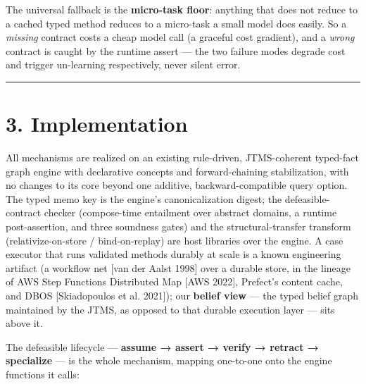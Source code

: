 \documentclass[11pt]{article}
\begin{document}
The universal fallback is the \textbf{micro-task floor}: anything that does not reduce to a cached typed method reduces to a micro-task a small model does easily. So a \emph{missing} contract costs a cheap model call (a graceful cost gradient), and a \emph{wrong} contract is caught by the runtime assert — the two failure modes degrade cost and trigger un-learning respectively, never silent error.

\medskip\hrule\medskip

\section*{3. Implementation}

All mechanisms are realized on an existing rule-driven, JTMS-coherent typed-fact graph engine with declarative concepts and forward-chaining stabilization, with no changes to its core beyond one additive, backward-compatible query option. The typed memo key is the engine's canonicalization digest; the defeasible-contract checker (compose-time entailment over abstract domains, a runtime post-assertion, and three soundness gates) and the structural-transfer transform (relativize-on-store / bind-on-replay) are host libraries over the engine. A case executor that runs validated methods durably at scale is a known engineering artifact (a workflow net [van der Aalst 1998] over a durable store, in the lineage of AWS Step Functions Distributed Map [AWS 2022], Prefect's content cache, and DBOS [Skiadopoulos et al. 2021]); our \textbf{belief view} — the typed belief graph maintained by the JTMS, as opposed to that durable execution layer — sits above it.

The defeasible lifecycle — \textbf{assume → assert → verify → retract → specialize} — is the whole mechanism, mapping one-to-one onto the engine functions it calls:
\end{document}
